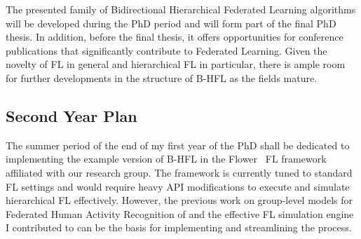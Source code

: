 
The presented family of Bidirectional Hierarchical Federated Learning algorithms will be developed during the PhD period and will form part of the final PhD thesis. In addition, before the final thesis, it offers opportunities for conference publications that significantly contribute to Federated Learning. Given the novelty of FL in general and hierarchical FL in particular, there is ample room for further developments in the structure of B-HFL as the fields mature.

\subsection{Second Year Plan}

The summer period of the end of my first year of the PhD shall be dedicated to implementing the example version of B-HFL in the Flower~\citep{Flower} FL framework affiliated with our research group. The framework is currently tuned to standard FL settings and would require heavy API modifications to execute and simulate hierarchical FL effectively. However, the previous work on group-level models for Federated Human Activity Recognition of \citet{OperaWorkshop} and the effective FL simulation engine I contributed to can be the basis for implementing and streamlining the process.

